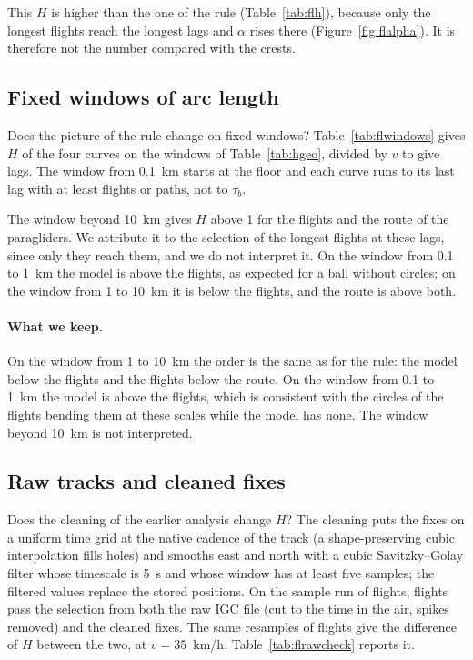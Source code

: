 This $H$ is higher than the one of the rule (Table~\ref{tab:flh}), because only the longest flights reach the
longest lags and $\alpha$ rises there (Figure~\ref{fig:flalpha}). It is therefore not the number compared with
the crests.

\subsection{Fixed windows of arc length}\label{sec:flwindows}

Does the picture of the rule change on fixed windows? Table~\ref{tab:flwindows} gives $H$ of the four curves on
the windows of Table~\ref{tab:hgeo}, divided by $v$ to give lags. The window from 0.1~km starts at the floor and each curve runs to its last lag with
at least \flMinRows{} flights or paths, not to $\tau_b$.

\begin{table}[t]
\centering
\caption{$H$ on fixed windows of arc length $s = v\tau$, with 95\% intervals.}
\label{tab:flwindows}
\scriptsize
\setlength{\tabcolsep}{2pt}

\end{table}

The window beyond 10~km gives $H$ above 1 for the flights and the route of the paragliders. We attribute it to
the selection of the longest flights at these lags, since only they reach them, and we do not interpret it. On the window from 0.1 to 1~km the model is above the flights, as expected for a ball without
circles; on the window from 1 to 10~km it is below the flights, and the route is above both.

\paragraph{What we keep.} On the window from 1 to 10~km the order is the same as for the rule: the model below
the flights and the flights below the route. On the window from 0.1 to 1~km the model is above the flights, which
is consistent with the circles of the flights bending them at these scales while the model has none. The window
beyond 10~km is not interpreted.

\subsection{Raw tracks and cleaned fixes}\label{sec:flraw}

Does the cleaning of the earlier analysis change $H$? The cleaning puts the fixes on a uniform time grid at the
native cadence of the track (a shape-preserving cubic interpolation fills holes) and smooths east and north with a
cubic Savitzky--Golay filter whose timescale is 5~s and whose window has at least five samples; the filtered
values replace the stored positions. On the sample run of \flRawNInSample{} flights, \flRawNBoth{} flights pass the
selection from both the raw IGC file (cut to the time in the air, spikes removed) and the cleaned fixes. The same
resamples of flights give the difference of $H$ between the two, at $v = 35$~km/h. Table~\ref{tab:flrawcheck}
reports it.

